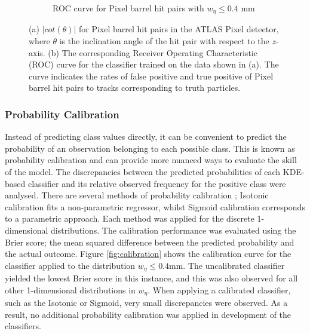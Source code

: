 \begin{figure}[!htbp]
\begin{subfigure}[b]{0.9\textwidth}
        \caption{ROC curve for Pixel barrel hit pairs with $w_{\eta} \leq 0.4$ mm }
        \label{fig:roc-curve}
    \end{subfigure}
\caption{(a) $\lvert cot(\theta) \rvert$ for Pixel barrel hit pairs in the ATLAS Pixel detector, where $\theta$ is the inclination angle of the hit pair with respect to the $z$-axis. (b) The corresponding Receiver Operating Characteristic (ROC) curve for the classifier trained on the data shown in (a). The curve indicates the rates of false positive and true positive of Pixel barrel hit pairs to tracks corresponding to truth particles.}
\label{fig:1-dimensional-classifier-training}
\end{figure}


\subsubsection{Probability Calibration}


Instead of predicting class values directly, it can be convenient to predict the probability of an observation belonging to each possible class. This is known as probability calibration and can provide more nuanced ways to evaluate the skill of the model. The discrepancies between the predicted probabilities of each KDE-based classifier and its relative observed frequency for the positive class were analysed. There are several methods of probability calibration \cite{prob-calibration}; Isotonic calibration fits a non-parametric regressor, whilst Sigmoid calibration corresponds to a parametric approach. Each method was applied for the discrete 1-dimensional distributions. The calibration performance was evaluated using the Brier score; the mean squared difference between the predicted probability and the actual outcome. Figure \ref{fig:calibration} shows the calibration curve for the classifier applied to the distribution $w_{\eta} \leq 0.4$mm. The uncalibrated classifier yielded the lowest Brier score in this instance, and this was also observed for all other 1-dimensional distributions in $w_{\eta}$. When applying a calibrated classifier, such as the Isotonic or Sigmoid, very small discrepancies were observed. As a result, no additional probability calibration was applied in development of the classifiers.


